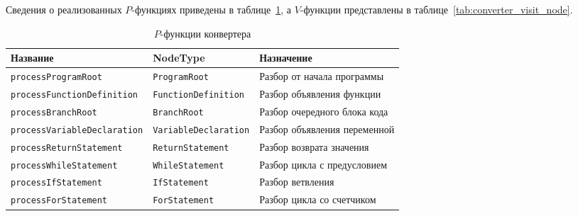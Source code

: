 Сведения о реализованных \(P\)-функциях приведены в таблице~\ref{tab:converter_process_node}, а \(V\)-функции представлены в таблице~\ref{tab:converter_visit_node}.

\begin{table}[h]
    \centering
    \caption{\(P\)-функции конвертера}
    \label{tab:converter_process_node}
    \begin{tabular}{lp{4cm}p{6cm}}
        \toprule
        \textbf{Название}                 & \textbf{NodeType\footnotemark[2]} & \textbf{Назначение}          \\
        \midrule
        \verb|processProgramRoot|         & \verb|ProgramRoot|                & Разбор от начала программы   \\
        \verb|processFunctionDefinition|  & \verb|FunctionDefinition|         & Разбор объявления функции    \\
        \verb|processBranchRoot|          & \verb|BranchRoot|                 & Разбор очередного блока кода \\
        \verb|processVariableDeclaration| & \verb|VariableDeclaration|        & Разбор объявления переменной \\
        \verb|processReturnStatement|     & \verb|ReturnStatement|            & Разбор возврата значения     \\
        \verb|processWhileStatement|      & \verb|WhileStatement|             & Разбор цикла с предусловием  \\
        \verb|processIfStatement|         & \verb|IfStatement|                & Разбор ветвления             \\
        \verb|processForStatement|        & \verb|ForStatement|               & Разбор цикла со счетчиком    \\
        \bottomrule
    \end{tabular}
\end{table}

